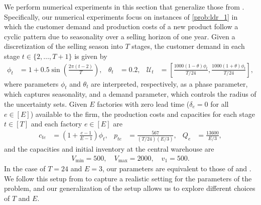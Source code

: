 \documentclass[nonblindrev,mnsc]{informs3} %
\begin{document}
We perform numerical experiments  in this section that generalize those from  \cite{ben2004adjustable,de2016impact}.  Specifically, our numerical experiments focus on instances of \eqref{prob:ldr_1} in which the customer demand and production costs of a new product follow a cyclic  pattern due to seasonality over a selling horizon of one year. 
Given a discretization of the selling season into $T$ stages, the  customer demand in each stage $t \in \{2,\ldots,T+1\}$ is given by
\begin{align}
    \phi_t &= 1 + 0.5 \sin\left(\frac{2 \pi (t-2)}{T} \right), & \theta_t &= 0.2, &  \mathcal{U}_t &=  \left[ \frac{1000  (1 - \theta)  \phi_t}{T / 24}, \frac{1000 (1+\theta)  \phi_t}{T/24}  \right], \label{prob:experiment_setup:1}
\end{align}
where parameters $\phi_t$ and $\theta_t$ are interpreted, respectively, as a phase parameter, which captures seasonality, and a demand parameter, which controls the radius of the uncertainty sets. Given $E$ factories with zero lead time ($\delta_e = 0$ for all $e \in [E]$) available to the firm, 
the production costs and capacities for each stage $t \in [T]$ and each factory $e \in [E]$ are 
\begin{align}
    c_{te} &= \left(1 + \frac{e-1}{E-1} \right) \phi_t, & p_{te} &= \frac{567}{\left( T/24\right)\left(E/3 \right)}, & Q_e &= \frac{13600}{E / 3},\label{prob:experiment_setup:2}
\end{align}
    and the capacities and initial inventory at the central warehouse are 
    \begin{gather} V_{\text{min}} = 500, \quad V_{\text{max}} = 2000, \quad v_1 = 500.\label{prob:experiment_setup:3}
\end{gather}
In the case of $T=24$ and $E =3$, our parameters are equivalent to those of \cite[\S 5]{ben2004adjustable} and \cite[Table 1]{de2016impact}. We follow this setup from \cite{ben2004adjustable,de2016impact} to capture a realistic setting for the parameters of the problem, and our generalization of the setup allows us to explore different choices of $T$ and $E$. 
\end{document}
